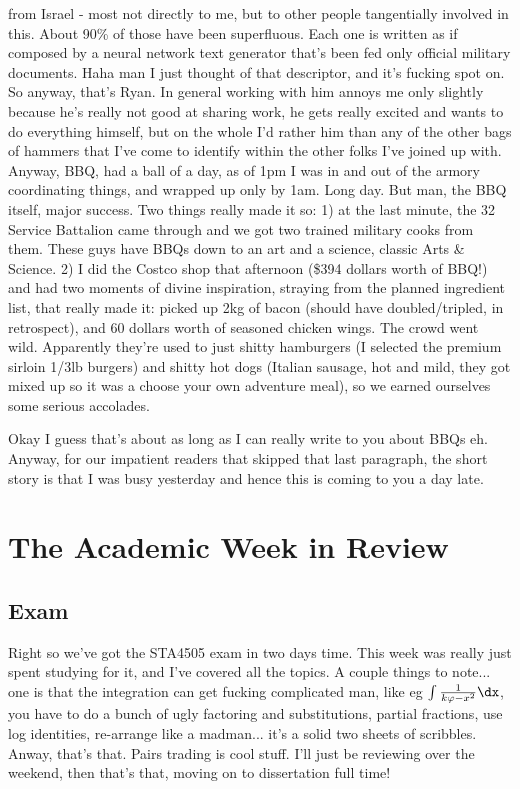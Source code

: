 \documentclass[12pt]{article}
\begin{document}
from Israel - most not directly to me, but to other people tangentially involved in this. About 90\% of those have been superfluous. Each one is written as if composed by a neural network text generator that's been fed only official military documents. Haha man I just thought of that descriptor, and it's fucking spot on. So anyway, that's Ryan. In general working with him annoys me only slightly because he's really not good at sharing work, he gets really excited and wants to do everything himself, but on the whole I'd rather him than any of the other bags of hammers that I've come to identify within the other folks I've joined up with. Anyway, BBQ, had a ball of a day, as of 1pm I was in and out of the armory coordinating things, and wrapped up only by 1am. Long day. But man, the BBQ itself, major success. Two things really made it so: 1) at the last minute, the 32 Service Battalion came through and we got two trained military cooks from them. These guys have BBQs down to an art and a science, classic Arts \& Science. 2) I did the Costco shop that afternoon (\$394 dollars worth of BBQ!) and had two moments of divine inspiration, straying from the planned ingredient list, that really made it: picked up 2kg of bacon (should have doubled/tripled, in retrospect), and 60 dollars worth of seasoned chicken wings. The crowd went wild. Apparently they're used to just shitty hamburgers (I selected the premium sirloin 1/3lb burgers) and shitty hot dogs (Italian sausage, hot and mild, they got mixed up so it was a choose your own adventure meal), so we earned ourselves some serious accolades. 

Okay I guess that's about as long as I can really write to you about BBQs eh. Anyway, for our impatient readers that skipped that last paragraph, the short story is that I was busy yesterday and hence this is coming to you a day late. 

\section*{The Academic Week in Review}
\subsection*{Exam}
Right so we've got the STA4505 exam in two days time. This week was really just spent studying for it, and I've covered all the topics. A couple things to note... one is that the integration can get fucking complicated man, like eg $\int \frac{1}{k\varphi - x^2} \dx$, you have to do a bunch of ugly factoring and substitutions, partial fractions, use log identities, re-arrange like a madman... it's a solid two sheets of scribbles. Anway, that's that. Pairs trading is cool stuff. I'll just be reviewing over the weekend, then that's that, moving on to dissertation full time!
\end{document}

